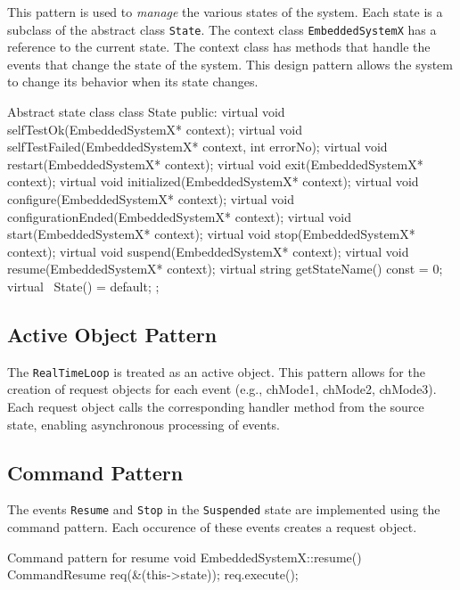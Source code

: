 \documentclass[../main.tex]{subfiles}
\begin{document}
This pattern is used to \textit{manage} the various states of the system. Each state is a subclass of the abstract class \texttt{State}. The context class \texttt{EmbeddedSystemX} has a reference to the current state. The context class has methods that handle the events that change the state of the system. This design pattern allows the system to change its behavior when its state changes.

\begin{myminted}{Abstract state class}
class State {
    public:
    virtual void selfTestOk(EmbeddedSystemX* context){};
    virtual void selfTestFailed(EmbeddedSystemX* context, int errorNo){};
    virtual void restart(EmbeddedSystemX* context){};
    virtual void exit(EmbeddedSystemX* context){};
    virtual void initialized(EmbeddedSystemX* context){};
    virtual void configure(EmbeddedSystemX* context){};
    virtual void configurationEnded(EmbeddedSystemX* context){};
    virtual void start(EmbeddedSystemX* context){};
    virtual void stop(EmbeddedSystemX* context){};
    virtual void suspend(EmbeddedSystemX* context){};
    virtual void resume(EmbeddedSystemX* context){};
    virtual string getStateName() const = 0;
    virtual ~State() = default;
};
\end{myminted}

\subsection{Active Object Pattern}

The \texttt{RealTimeLoop} is treated as an active object. This pattern allows for the creation of request objects for each event (e.g., chMode1, chMode2, chMode3). Each request object calls the corresponding handler method from the source state, enabling asynchronous processing of events.

\newpage

\subsection{Command Pattern}

The events \texttt{Resume} and \texttt{Stop} in the \texttt{Suspended} state are implemented using the command pattern. Each occurence of these events creates a request object.

\begin{myminted}{Command pattern for resume}
void EmbeddedSystemX::resume() {
    CommandResume req(&(this->state));
    req.execute();
}
\end{myminted}
\end{document}
